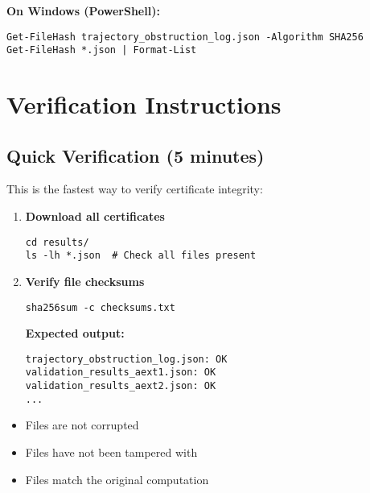 \documentclass[11pt,a4paper]{article}
\theoremstyle{definition}
\begin{document}
\textbf{On Windows (PowerShell):}
\begin{lstlisting}[style=bashstyle]
Get-FileHash trajectory_obstruction_log.json -Algorithm SHA256
Get-FileHash *.json | Format-List
\end{lstlisting}

\section{Verification Instructions}

\subsection{Quick Verification (5 minutes)}

This is the fastest way to verify certificate integrity:

\begin{enumerate}
    \item \textbf{Download all certificates}
    \begin{lstlisting}[style=bashstyle]
cd results/
ls -lh *.json  # Check all files present
    \end{lstlisting}
    
    \item \textbf{Verify file checksums}
    \begin{lstlisting}[style=bashstyle]
sha256sum -c checksums.txt
    \end{lstlisting}
    
    \textbf{Expected output:}
    \begin{lstlisting}[style=bashstyle]
trajectory_obstruction_log.json: OK
validation_results_aext1.json: OK
validation_results_aext2.json: OK
...
    \end{lstlisting}
\end{enumerate}

\begin{infobox}[title={What This Verifies}]
\begin{itemize}
    \item Files are not corrupted
    \item Files have not been tampered with
    \item Files match the original computation
\end{itemize}
\end{infobox}
\end{document}
